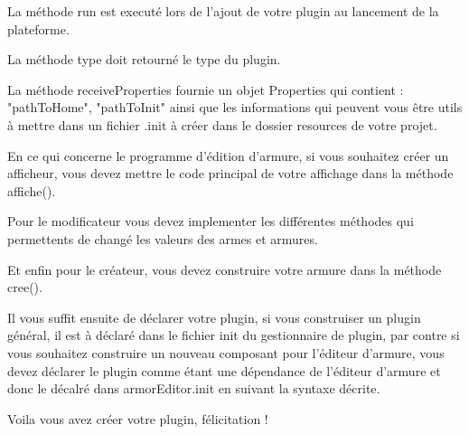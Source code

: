 La méthode run est executé lors de l'ajout de votre plugin au lancement de la plateforme.

La méthode type doit retourné le type du plugin.

La méthode receiveProperties fournie un objet Properties qui contient : "pathToHome", "pathToInit" ainsi que les informations qui peuvent vous être utils à mettre dans un fichier .init à créer dans le dossier resources de votre projet.
\vspace{0.5cm}

En ce qui concerne le programme d'édition d'armure, si vous souhaitez créer un afficheur, vous devez mettre le code principal de votre affichage dans la méthode affiche().

Pour le modificateur vous devez implementer les différentes méthodes qui permettents de changé les valeurs des armes et armures.

Et enfin pour le créateur, vous devez construire votre armure dans la méthode cree().
\vspace{0.5cm}

Il vous suffit ensuite de déclarer votre plugin, si vous construiser un plugin général, il est à déclaré dans le fichier init du gestionnaire de plugin, par contre si vous souhaitez construire un nouveau composant pour l'éditeur d'armure, vous devez déclarer le plugin comme étant une dépendance de l'éditeur d'armure et donc le décalré dans armorEditor.init en suivant la syntaxe décrite.
\vspace{0.5cm}

Voila vous avez créer votre plugin, félicitation !
